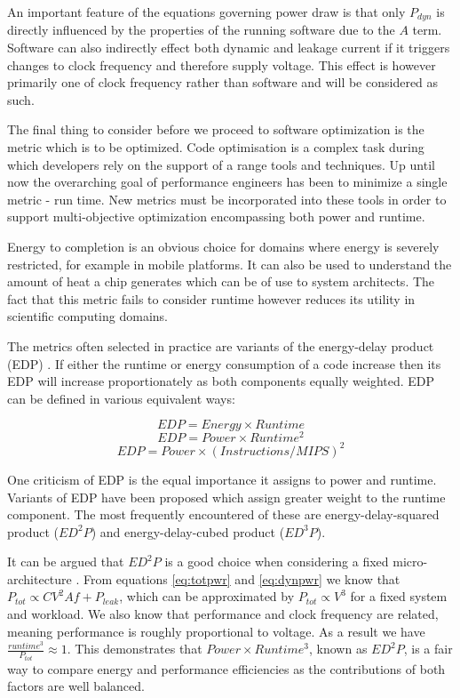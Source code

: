 An important feature of the equations governing power draw is that only $P_{dyn}$ is directly influenced by the properties of the running software due to the $A$ term. Software can also indirectly effect both dynamic and leakage current if it triggers changes to clock frequency and therefore supply voltage. This effect is however primarily one of clock frequency rather than software and will be considered as such.\golden

The final thing to consider before we proceed to software optimization is the metric which is to be optimized. Code optimisation is a complex task during which developers rely on the support of a range tools and techniques. Up until now the overarching goal of performance engineers has been to minimize a single metric - run time. New metrics must be incorporated into these tools in order to support multi-objective optimization encompassing both power and runtime. \golden

Energy to completion is an obvious choice for domains where energy is severely restricted, for example in mobile platforms. It can also be used to understand the amount of heat a chip generates which can be of use to system architects. The fact that this metric fails to consider runtime however reduces its utility in scientific computing domains.\golden

The metrics often selected in practice are variants of the energy-delay product (EDP) \cite{gonzales:1995aa}. If either the runtime or energy consumption of a code increase then its EDP will increase proportionately as both components equally weighted. EDP can be defined in various equivalent ways:\golden

\begin{equation}
EDP = Energy \times Runtime
\end{equation}
\begin{equation}
EDP = Power \times Runtime^{2}
\end{equation}
\begin{equation}
EDP = Power \times (Instructions / MIPS)^{2}
\end{equation}

One criticism of EDP is the equal importance it assigns to power and runtime. Variants of EDP have been proposed which assign greater weight to the runtime component. The most frequently encountered of these are  energy-delay-squared product ($ED^{2}P$) and energy-delay-cubed product ($ED^{3}P$). \golden


 It can be argued that $ED^{2}P$ is a good choice when considering a fixed micro-architecture \cite{brooks:2000aa}. From equations \ref{eq:totpwr} and \ref{eq:dynpwr} we know that $P_{tot} \propto CV^{2}Af + P_{leak} $, which can be approximated by $P_{tot} \propto V^{3}$ for a fixed system and workload. We also know that performance and clock frequency are related, meaning performance is roughly proportional to voltage. As a result we have $\frac{runtime^{3}}{P_{tot}} \approx 1$. This demonstrates that $Power \times Runtime^{3}$, known as $ED^{2}P$, is a fair way to compare energy and performance efficiencies as the contributions of both factors are well balanced. \golden